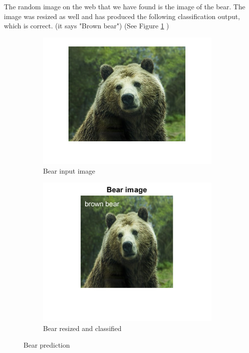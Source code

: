 \documentclass[a4paper]{iacas}
\begin{document}
\subsubsection{}
The random image on the web that we have found is the image of the bear. The image was resized as well and has produced the following classification output, which is correct. (it says "Brown bear") (See Figure  \ref{Bear prediction} )

\vskip 0.1in
\begin{figure}[h!]
  \begin{subfigure}{0.4\linewidth}
	\includegraphics[width=\linewidth]{imgs/bear.png}
	\caption{Bear input image}
  \end{subfigure}
  \begin{subfigure}{0.4\linewidth}
	\includegraphics[width=\linewidth]{imgs/bear_classified.png}
	\caption{Bear resized and classified}
  \end{subfigure}
\caption{Bear prediction}
\label{Bear prediction}
\end{figure}
\vskip 0.1in
\end{document}
